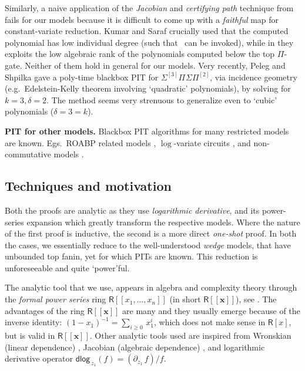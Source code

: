 \documentclass[10pt,a4paper]{article}
\newcommand{\ringR}{\mathsf{R}}
\newcommand{\x}{{\boldsymbol x}}
\newcommand{\dlg}{\mathsf{dlog}}
\newcommand{\SPSP}[3]{\Sigma^{#1}\Pi^{#2}\Sigma\Pi^{#3}}
\numberwithin{equation}{section}
\begin{document}
Similarly, a naive application of the \emph{Jacobian} and \emph{certifying path} technique from \cite{agrawal2016jacobian} fails for our models because it is difficult to come up with a \emph{faithful} map for constant-variate reduction. Kumar and Saraf \cite{DBLP:conf/coco/0001S16a} crucially used that the computed polynomial has low individual degree (such that~\cite{dvir2010hardness} can be invoked), while in \cite{DBLP:journals/toc/0001S17} they exploits the low algebraic rank of the polynomials computed below the top $\Pi$-gate. Neither of them hold in general for our models. Very recently, Peleg and Shpilka \cite{peleg2020polynomial} gave a poly-time blackbox PIT for $\SPSP{[3]}{}{[2]}$, via incidence geometry (e.g.~Edelstein-Kelly theorem involving `quadratic' polynomials), by solving \cite[Conj.~1]{gupta2014algebraic} for $k=3,\delta=2$. The method seems very strenuous to generalize even to `cubic' polynomials ($\delta=3=k$). 

\textbf{PIT for other models. } Blackbox PIT algorithms for many restricted models are known. Egs.~ROABP related models \cite{raz2005deterministic,jansen2010deterministic, agrawal2015hitting,gurjarARO,gurjar2017deterministic,forbes2014hitting,anderson2018identity}, $\log$-variate circuits \cite{forbes2018towards,bisht2020poly}, and non-commutative models \cite{garg2016deterministic,DBLP:journals/cjtcs/LagardeMP19}.

\subsection{Techniques and motivation}\label{sec:pf-ideas}

Both the proofs are analytic as they use \emph{logarithmic derivative}, and its power-series expansion which greatly transform the respective models. Where the nature of the first proof is inductive, the second is a more direct \emph{one-shot} proof. In both the cases, we essentially reduce to the well-understood \emph{wedge} models, that have unbounded top fanin, yet for which PITs are known. This reduction is unforeseeable and quite `power'ful.  

The analytic tool that we use, appears in algebra and complexity theory through the \emph{formal power series} ring $\ringR[[x_1,\hdots,x_n]]$ (in short $\ringR[[\x]]$), see \cite{10.2307/2317940,sinhababu2019power,dutta2018discovering}. The advantages of the ring $\ringR[[\x]]$ are many and they usually emerge because of the inverse identity: $(1 - x_1)^{-1} = \sum_{i \ge 0}\, x_1^i$, which does not make sense in $\ringR[x]$, but is valid in $\ringR[[\x]]$. Other analytic tools used are inspired from Wronskian (linear dependence) \cite[Theorem~7]{koiran2015wronskian} \cite{kayal2015lower}, Jacobian (algebraic dependence) \cite{beecken2013algebraic, agrawal2016jacobian,pandey2018algebraic}, and logarithmic derivative operator $\dlg_{\,z_1}(f) = (\partial_{z_1}\,f)/f$.
\end{document}

